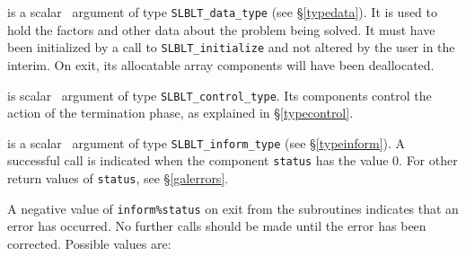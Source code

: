 \documentclass{galahad}
\newcommand{\packagename}{SLBLT}
\begin{document}
\begin{description}

 is a scalar \intentinout\ argument of type
{\tt \packagename\_data\_type}
(see \S\ref{typedata}). It is used to hold the factors and other
data about the problem being solved.
It must have been initialized by a call to
{\tt \packagename\_ini\-tialize} and not altered by the user in the interim.
On exit, its allocatable array components will have been deallocated.

 is scalar \intentin\ argument of type
{\tt \packagename\_control\_type}. Its components control the action
of the termination phase, as explained in
\S\ref{typecontrol}.

 is a scalar \intentinout\ argument of type
{\tt \packagename\_inform\_type}
(see \S\ref{typeinform}).
A successful call is indicated when the  component {\tt status} has the value 0.
For other return values of {\tt status}, see \S\ref{galerrors}.

\end{description}


\galerrors
A negative value of {\tt inform\%status} on exit from the subroutines
indicates that an error has occurred. No further calls should be made
until the error has been corrected. Possible values are:
\end{document}
